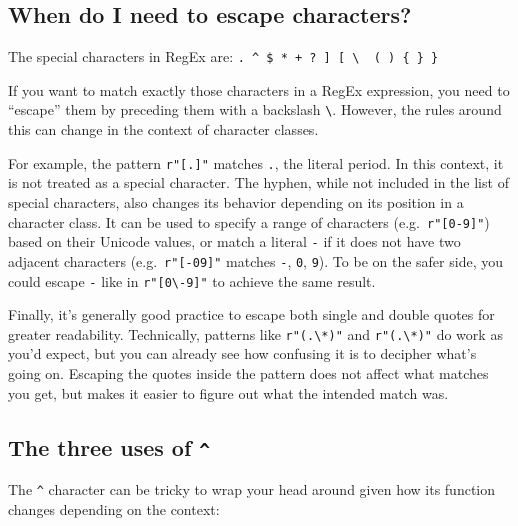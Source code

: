 \documentclass[
  letterpaper,
  DIV=11,
  numbers=noendperiod]{scrreprt}
\begin{document}
\subsection{When do I need to escape
characters?}\label{when-do-i-need-to-escape-characters}

The special characters in RegEx are:
\texttt{.\ \^{}\ \$\ *\ +\ ?\ {]}\ {[}\ \textbackslash{}\ \textbar{}\ (\ )\ \{\ \}\ \}}

If you want to match exactly those characters in a RegEx expression, you
need to ``escape'' them by preceding them with a backslash
\texttt{\textbackslash{}}. However, the rules around this can change in
the context of character classes.

For example, the pattern \texttt{r"{[}.{]}"} matches
\texttt{\textquotesingle{}.\textquotesingle{}}, the literal period. In
this context, it is not treated as a special character. The hyphen,
while not included in the list of special characters, also changes its
behavior depending on its position in a character class. It can be used
to specify a range of characters (e.g.~\texttt{r"{[}0-9{]}"}) based on
their Unicode values, or match a literal
\texttt{\textquotesingle{}-\textquotesingle{}} if it does not have two
adjacent characters (e.g.~\texttt{r"{[}-09{]}"} matches \texttt{-},
\texttt{0}, \texttt{9}). To be on the safer side, you could escape
\texttt{-} like in \texttt{r"{[}0\textbackslash{}-9{]}"} to achieve the
same result.

Finally, it's generally good practice to escape both single and double
quotes for greater readability. Technically, patterns like
\texttt{r"\textquotesingle{}(.\textbackslash{}*)\textquotesingle{}"} and
\texttt{r\textquotesingle{}"(.\textbackslash{}*)"\textquotesingle{}} do
work as you'd expect, but you can already see how confusing it is to
decipher what's going on. Escaping the quotes inside the pattern does
not affect what matches you get, but makes it easier to figure out what
the intended match was.

\subsection{\texorpdfstring{The three uses of
\texttt{\^{}}}{The three uses of \^{}}}\label{the-three-uses-of}

The \texttt{\^{}} character can be tricky to wrap your head around given
how its function changes depending on the context:
\end{document}
